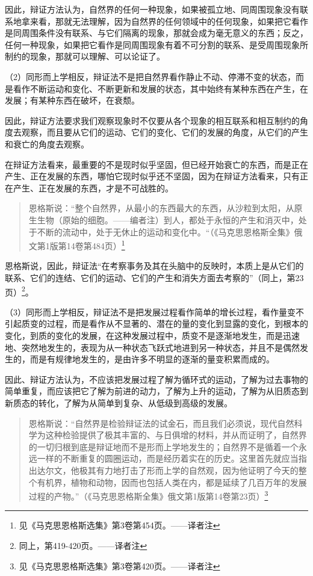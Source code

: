因此，辩证方法认为，自然界的任何一种现象，如果被孤立地、同周围现象没有联系地拿来看，那就无法理解，因为自然界的任何领域中的任何现象，如果把它看作是同周围条件没有联系、与它们隔离的现象，那就会成为毫无意义的东西；反之，任何一种现象，如果把它看作是同周围现象有着不可分割的联系、是受周围现象所制约的现象，那就可以理解、可以论证了。

（2）同形而上学相反，辩证法不是把自然界看作静止不动、停滞不变的状态，而是看作不断运动和变化、不断更新和发展的状态，其中始终有某种东西在产生，在发展；有某种东西在破坏，在衰颓。

因此，辩证方法要求我们观察现象时不仅要从各个现象的相互联系和相互制约的角度去观察，而且要从它们的运动、它们的变化、它们的发展的角度，从它们的产生和衰亡的角度去观察。

在辩证方法看来，最重要的不是现时似乎坚固，但已经开始衰亡的东西，而是正在产生、正在发展的东西，哪怕它现时似乎还不坚固，因为在辩证方法看来，只有正在产生、正在发展的东西，才是不可战胜的。

\begin{quotation}
恩格斯说：“整个自然界，从最小的东西最大的东西，从沙粒到太阳，从原生生物（原始的细胞。——编者注）到人，都处于永恒的产生和消灭中，处于不断的流动中，处于无休止的运动和变化中。“（《马克思恩格斯全集》俄文第1版第14卷第484页）\footnote{见《马克思恩格斯选集》第3卷第454页。——译者注}
\end{quotation}

恩格斯说，因此，辩证法“在考察事务及其在头脑中的反映时，本质上是从它们的联系、它们的连结、它们的运动、它们的产生和消失方面去考察的”（同上，第23页）\footnote{同上，第419-420页。——译者注}。

（3）同形而上学相反，辩证法不是把发展过程看作简单的增长过程，看作量变不引起质变的过程，而是看作从不显著的、潜在的量的变化到显露的变化，到根本的变化，到质的变化的发展，在这种发展过程中，质变不是逐渐地发生，而是迅速地、突然地发生的，表现为从一种状态飞跃式地进到另一种状态，并且不是偶然发生的，而是有规律地发生的，是由许多不明显的逐渐的量变积累而成的。

因此、辩证方法认为，不应该把发展过程了解为循环式的运动，了解为过去事物的简单重复，而应该把它了解为前进的动力，了解为上升的运动，了解为从旧质态到新质态的转化，了解为从简单到复杂、从低级到高级的发展。

\begin{quotation}
恩格斯说：“自然界是检验辩证法的试金石，而且我们必须说，现代自然科学为这种检验提供了极其丰富的、与日俱增的材料，并从而证明了，自然界的一切归根到底是辩证地而不是形而上学地发生的；自然界不是循着一个永远一样的不断重复的圆圈运动，而是经历着实在的历史。这里首先就应当指出达尔文，他极其有力地打击了形而上学的自然观，因为他证明了今天的整个有机界，植物和动物，因而也包括人类在内，都是延续了几百万年的发展过程的产物。”（《马克思恩格斯全集》俄文第1版第14卷第23页）\footnote{见《马克思恩格斯选集》第3卷第420页。——译者注}
\end{quotation}

